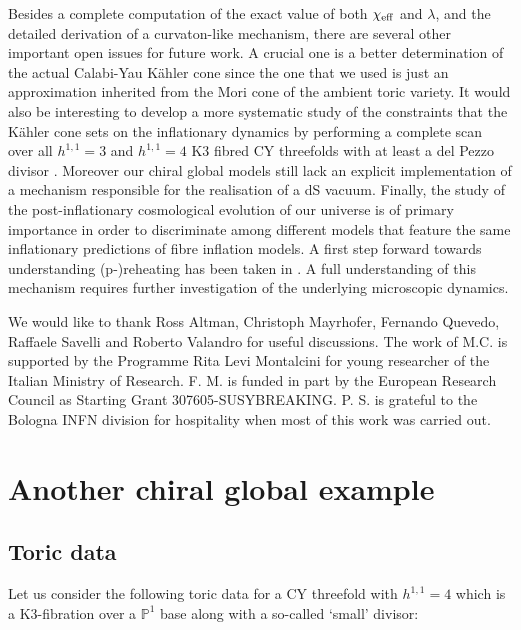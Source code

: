 \documentclass[11pt,a4paper]{article}
\newcommand{\mP}{\mathbb{P}}
\begin{document}
Besides a complete computation of the exact value of both $\chi_{\rm eff}$ and $\lambda$, and the detailed derivation of a curvaton-like mechanism, there are several other important open issues for future work. A crucial one is a better determination of the actual Calabi-Yau K\"ahler cone since the one that we used is just an approximation inherited from the Mori cone of the ambient toric variety. It would also be interesting to develop a more systematic study of the constraints that the K\"ahler cone sets on the inflationary dynamics by performing a complete scan over all $h^{1,1}=3$ and $h^{1,1}=4$ K3 fibred CY threefolds with at least a del Pezzo divisor \cite{Cicoli:2018tcq}. Moreover our chiral global models still lack an explicit implementation of a mechanism responsible for the realisation of a dS vacuum. Finally, the study of the post-inflationary cosmological evolution of our universe is of primary importance in order to discriminate among different models that feature the same inflationary predictions of fibre inflation models. A first step forward towards understanding (p-)reheating has been taken in \cite{Cabella:2017zsa, Antusch:2017flz}. A full understanding of this mechanism requires further investigation of the underlying microscopic dynamics. 


\acknowledgments

We would like to thank Ross Altman, Christoph Mayrhofer, Fernando Quevedo, Raffaele Savelli and Roberto Valandro for useful discussions. The work of M.C. is supported by the Programme Rita Levi Montalcini for young researcher of the Italian Ministry of Research. F. M. is funded in part by the European Research Council as Starting Grant 307605-SUSYBREAKING. P. S. is grateful to the Bologna INFN division for hospitality when most of this work was carried out.

\appendix

\section{Another chiral global example}
\label{ExB}

\subsection{Toric data}

Let us consider the following toric data for a CY threefold with $h^{1,1}=4$ which is a K3-fibration over a $\mP^1$ base along with a so-called `small' divisor:
\end{document}
